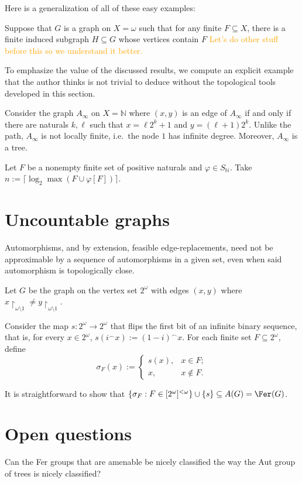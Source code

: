 \documentclass[12pt]{article}
\begin{document}
Here is a generalization of all of these easy examples:

\begin{theorem}
    Suppose that $G$ is a graph on $X=\omega$ such that for any finite $F\subseteq X$, there is a finite induced subgraph $H\subseteq G$ whose vertices contain $F$ \textcolor{orange}{Let's do other stuff before this so we understand it better.}
\end{theorem}

To emphasize the value of the discussed results, we compute an explicit example that the author thinks is not trivial to deduce without the topological tools developed in this section.

Consider the graph $A_\infty$ on $X=\mathbb N$ where $(x,y)$ is an edge of $A_\infty$ if and only if there are naturals $k,\ell$ such that $x=\ell2^k+1$ and $y=(\ell+1)2^k$.
Unlike the path, $A_\infty$ is not locally finite, i.e.\ the node $1$ has infinite degree.
Moreover, $A_\infty$ is a tree.

Let $F$ be a nonempty finite set of positive naturals and $\varphi\in S_\mathbb N$.
Take $n:=\lceil\log_2\max(F\cup\varphi[F])\rceil$.

\section{Uncountable graphs}\label{sec:uncountable-graphs}

Automorphisms, and by extension, feasible edge-replacements, need not be approximable by a sequence of automorphisms in a given set, even when said automorphism is topologically close.

\begin{proposition}\label{prop:aut_closure_not_seq}
    Let $G$ be the graph on the vertex set $2^\omega$ with edges $(x,y)$ where $x\restriction_{\omega\setminus 1}\neq y\restriction_{\omega\setminus 1}$.
    
    Consider the map $s\colon2^\omega\to2^\omega$ that flips the first bit of an infinite binary sequence, that is, for every $x\in2^\omega$, $s(i^\frown x):=(1-i)^\frown x$.
    For each finite set $F\subseteq2^\omega$, define $$\sigma_F(x):=\begin{cases}
        s(x),&x\in F;\\
        x,&x\notin F.
    \end{cases}$$

    It is straightforward to show that $\{\sigma_F:F\in[2^\omega]^{<\omega}\}\cup\{s\}\subseteq A(G)=\Fer(G)$.
\end{proposition}

\section{Open questions}

Can the Fer groups that are amenable be nicely classified the way the Aut group of trees is nicely classified?

\nocite{*}


\end{document}

